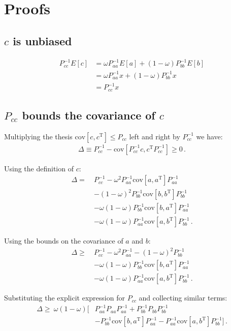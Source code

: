 \documentclass[11pt]{article}
\newcommand{\cov}{\mathrm{cov}}
\newcommand{\transpose}{\mathrm{\scriptscriptstyle T}}
\begin{document}
\section{Proofs}
\subsection{$c$ is unbiased}
\label{proof_c_is_unbiased}
\begin{align}
P_{cc}^{-1}E[c] &= \omega P_{aa}^{-1}E[a] + (1 - \omega) P_{bb}^{-1}E[b] \\
                &= \omega P_{aa}^{-1}x + (1 - \omega) P_{bb}^{-1}x \\
                &= P_{cc}^{-1}x
\end{align}

\subsection{$P_{cc}$ bounds the covariance of $c$}
\label{proof_pcc_bounds_covariance}

Multiplying the thesis $\cov[c, c^\transpose] \leq P_{cc}$ left and right by
$P_{cc}^{-1}$ we have:
\begin{align}
    \Delta \equiv P_{cc}^{-1} - \cov[P_{cc}^{-1} c, c^{\transpose} P_{cc}^{-1}] \geq 0\,.
\end{align}

Using the definition of $c$:
\begin{align}
\Delta =\
&P_{cc}^{-1} - \omega^2P_{aa}^{-1}\cov[a, a^\transpose] P_{aa}^{-1} \\
&- (1-\omega)^2P_{bb}^{-1}\cov[b, b^\transpose] P_{bb}^{-1} \\
&- \omega(1-\omega)P_{bb}^{-1}\cov[b, a^\transpose] P_{aa}^{-1}\\
&- \omega(1-\omega)P_{aa}^{-1}\cov[a, b^\transpose] P_{bb}^{-1}\,.
\end{align}

Using the bounds on the covariance of $a$ and $b$:
\begin{align}
\Delta \ge\
&P_{cc}^{-1} - \omega^2P_{aa}^{-1} - (1-\omega)^2P_{bb}^{-1} \\
&- \omega(1-\omega)P_{bb}^{-1}\cov[b, a^\transpose] P_{aa}^{-1}\\
&- \omega(1-\omega)P_{aa}^{-1}\cov[a, b^\transpose] P_{bb}^{-1}\,.
\end{align}

Substituting the explicit expression for $P_{cc}$ and collecting similar terms:
\begin{align}
\Delta \ge\ \omega(1-\omega) \Big[&
    P_{aa}^{-1}P_{aa}P_{aa}^{-1} + P_{bb}^{-1}P_{bb}P_{bb}^{-1} \\
&- P_{bb}^{-1}\cov[b, a^\transpose] P_{aa}^{-1}- P_{aa}^{-1}\cov[a, b^\transpose] P_{bb}^{-1} \Big]\,.
\end{align}
\end{document}
